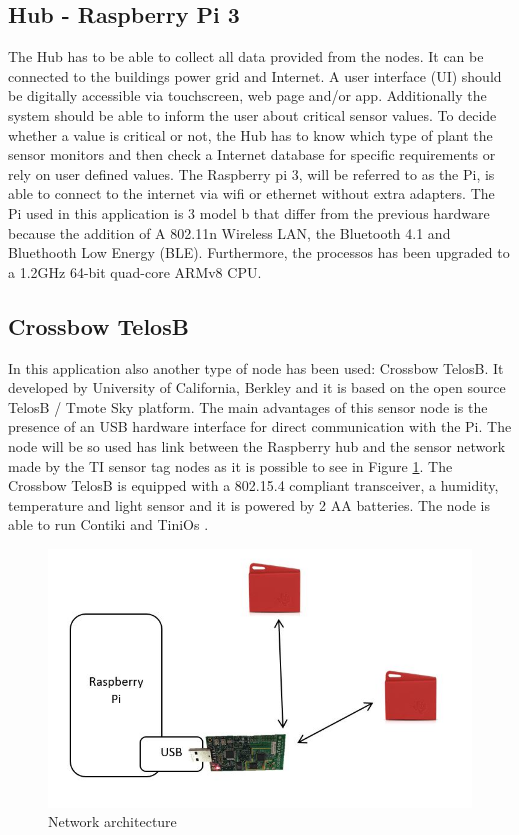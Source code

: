 \subsection{Hub - Raspberry Pi 3}
The Hub has to be able to collect all data provided from the nodes. It can be connected to the buildings power grid and Internet. A user interface (UI) should be digitally accessible via touchscreen, web page and/or app. Additionally the system should be able to inform the user about critical sensor values. To decide whether a value is critical or not, the Hub has to know which type of plant the sensor monitors and then check a Internet database for specific requirements or rely on user defined values.
The Raspberry pi 3, will be referred to as the Pi, is able to connect to the internet via wifi or ethernet without extra adapters. The Pi used in this application is 3 model b that differ from the previous hardware because the addition of A
802.11n Wireless LAN, the Bluetooth 4.1 and Bluethooth Low Energy (BLE). Furthermore, the processos has been upgraded to a 1.2GHz 64-bit quad-core ARMv8 CPU. \cite{pi}\\

\subsection{Crossbow TelosB}
In this application also another type of node has been used: Crossbow TelosB. It developed by University of California, Berkley and it is based on the open source TelosB / Tmote Sky platform. 
The main advantages of this sensor node is the presence of an USB hardware interface for direct communication with the Pi. The node will be so used has link between the Raspberry hub and the sensor network made by the TI sensor tag nodes as it is possible to see in Figure \ref{fig:Architecture}.
The Crossbow TelosB is equipped with a 802.15.4 compliant transceiver, a humidity, temperature and light sensor and it is powered by 2 AA batteries. The node is able to run Contiki and TiniOs \cite{TB}.\\
\begin{figure}[!h]
	\includegraphics[width=\linewidth]{Architecture}
	\caption{Network architecture}
	\label{fig:Architecture}
\end{figure}


